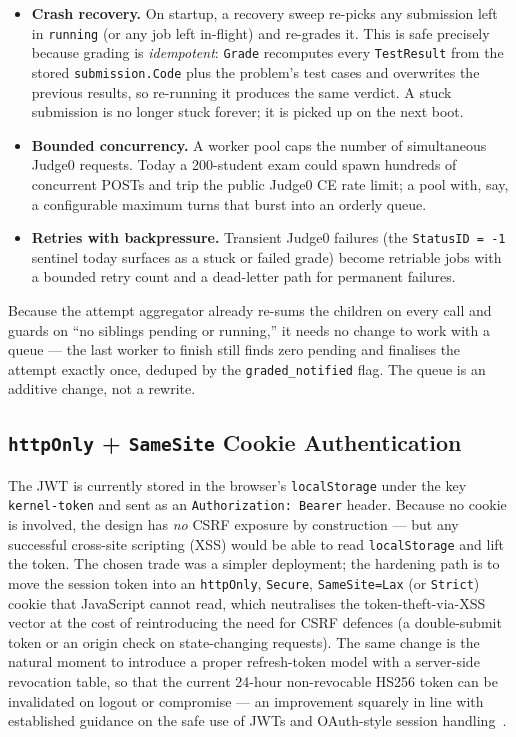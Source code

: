 \begin{itemize}
  \item \textbf{Crash recovery.} On startup, a recovery sweep re-picks any
    submission left in \texttt{running} (or any job left in-flight) and
    re-grades it. This is safe precisely because grading is
    \emph{idempotent}: \texttt{Grade} recomputes every \texttt{TestResult} from
    the stored \texttt{submission.Code} plus the problem's test cases and
    overwrites the previous results, so re-running it produces the same verdict.
    A stuck submission is no longer stuck forever; it is picked up on the next
    boot.
  \item \textbf{Bounded concurrency.} A worker pool caps the number of
    simultaneous Judge0 requests. Today a 200-student exam could spawn hundreds
    of concurrent POSTs and trip the public Judge0 CE rate limit; a pool with,
    say, a configurable maximum turns that burst into an orderly queue.
  \item \textbf{Retries with backpressure.} Transient Judge0 failures (the
    \texttt{StatusID = -1} sentinel today surfaces as a stuck or failed grade)
    become retriable jobs with a bounded retry count and a dead-letter path for
    permanent failures.
\end{itemize}

Because the attempt aggregator already re-sums the children on every call and
guards on ``no siblings pending or running,'' it needs no change to work with a
queue --- the last worker to finish still finds zero pending and finalises the
attempt exactly once, deduped by the \texttt{graded\_notified} flag. The queue
is an additive change, not a rewrite.

\subsection{\texttt{httpOnly} + \texttt{SameSite} Cookie Authentication}

The JWT is currently stored in the browser's \texttt{localStorage} under the key
\texttt{kernel-token} and sent as an \texttt{Authorization: Bearer} header.
Because no cookie is involved, the design has \emph{no} CSRF exposure by
construction --- but any successful cross-site scripting (XSS) would be able to
read \texttt{localStorage} and lift the token. The chosen trade was a simpler
deployment; the hardening path is to move the session token into an
\texttt{httpOnly}, \texttt{Secure}, \texttt{SameSite=Lax} (or \texttt{Strict})
cookie that JavaScript cannot read, which neutralises the token-theft-via-XSS
vector at the cost of reintroducing the need for CSRF defences (a
double-submit token or an origin check on state-changing requests). The same
change is the natural moment to introduce a proper refresh-token model with a
server-side revocation table, so that the current 24-hour non-revocable HS256
token can be invalidated on logout or compromise --- an improvement squarely in
line with established guidance on the safe use of JWTs and OAuth-style session
handling~\cite{rfc7519,owasp-jwt,rfc6749,nist80063b}.

